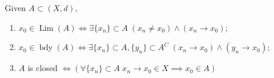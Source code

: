 \documentclass[notoc,notitlepage]{tufte-book}
\DeclareMathOperator{\bdy}{bdy }
\DeclareMathOperator{\Lim}{Lim }
\begin{document}
\begin{thm}\label{thm:sequential_characterizations_of_limit_points_boundaries_and_closedness}
  Given $A \subset (X, d)$,
  \begin{enumerate}
    \item $x_0 \in \Lim(A) \iff \exists \{ x_n \} \subset A \; ( x_n \neq x_0 ) \land ( x_n \to x_0 )$; \label{item:sequential_characterizations_of_limit_points_boundaries_and_closedness_1}
    \item $x_0 \in \bdy(A) \iff \exists \{ x_n \} \subset A, \{ y_n \} \subset A^C \; ( x_n \to x_0 ) \land ( y_n \to x_0 )$;\label{item:sequential_characterizations_of_limit_points_boundaries_and_closedness_2}
      \item $A$ is closed $\iff ( \forall \{ x_n \} \subset A \; x_n \to x_0 \in X \implies x_0 \in A )$\label{item:sequential_characterizations_of_limit_points_boundaries_and_closedness_3}
  \end{enumerate}
\end{thm}
\end{document}
